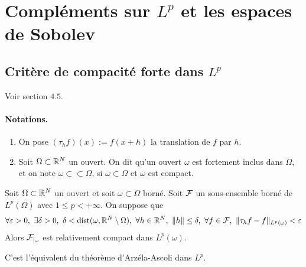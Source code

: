 
\section{Compléments sur \texorpdfstring{$L^p$}{Lp} et les espaces de Sobolev}
\subsection{Critère de compacité forte dans \texorpdfstring{$L^p$}{Lp}}
Voir \cite{Brezis1987} section $4.5$.
\paragraph{Notations.}
\begin{enumerate}
    \item  On pose $(\tau_h f)(x):=f(x+h)$ la translation de $f$ par $h$.
    \item Soit $\Omega \subset \mathbb{R}^N$ un ouvert. On dit qu'un ouvert $\omega$ est \textcolor{astral}{fortement inclus dans $\Omega$}, et on note $\omega \subset \subset \Omega$, si $\overline{\omega} \subset \Omega$ et $\overline{\omega}$ est compact.
\end{enumerate}

\begin{theorem}
    Soit $\Omega \subset \mathbb{R}^N$ un ouvert et soit $\omega \subset \Omega$ borné. Soit $\mathcal{F}$ un sous-ensemble borné de $L^p(\Omega)$ avec $1 \leq p < +\infty$. On suppose que 
    \begin{equation*}
        \forall \varepsilon >0, \ \exists \delta >0, \ \delta < \mathrm{dist}(\omega, \bbR^N \setminus \Omega), \ \forall h \in \bbR^N, \ \|h\| \leq \delta, \ \forall f \in \calF, \ \|\tau_hf-f\|_{L^p(\omega)} < \varepsilon
    \end{equation*}
    Alors $\mathcal{F}_{|_{\omega}}$ est relativement compact dans $L^p(\omega)$.
\end{theorem}

\begin{remark}
    C'est l'équivalent du théorème d'Arzéla-Ascoli dans $L^p$.
\end{remark}

